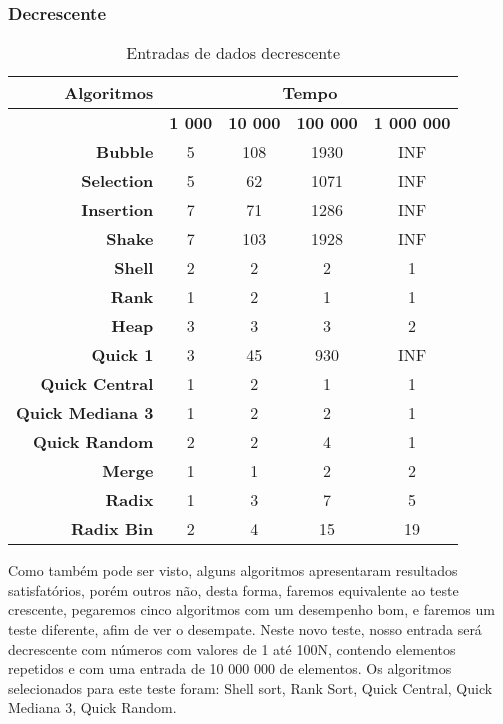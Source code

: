 \documentclass[
	12pt,				%
	oneside,			%
	a4paper,			%
	english,			%
	brazil,				%
	]{article}
\begin{document}
\subsubsection{Decrescente}
\begin{table}[H]
\centering
\begin{tabular}{|r|c|c|c|c|}
\cline{1-5} 
 \textbf{Algoritmos} & \multicolumn{4}{|c|}{\textbf{Tempo}}  \\
 \hline
 \textbf{} & \textbf{1 000} & \textbf{10 000} & \textbf{100 000} & \textbf{1 000 000}\\
 \hline
 \textbf{Bubble} & 5 & 108 & 1930 & INF \\
 \hline
 \textbf{Selection} & 5 & 62 & 1071 & INF \\
 \hline
 \textbf{Insertion} & 7 & 71 & 1286 & INF \\
 \hline
 \textbf{Shake} & 7 & 103 & 1928 & INF \\
 \hline
 \textbf{Shell} & 2 & 2 & 2 & 1 \\
 \hline
 \textbf{Rank} & 1 & 2 & 1 & 1 \\
 \hline
 \textbf{Heap} & 3 & 3 & 3 & 2 \\
 \hline
 \textbf{Quick 1} & 3 & 45 & 930 & INF \\
 \hline
 \textbf{Quick Central} & 1 & 2 & 1 & 1 \\
 \hline
 \textbf{Quick Mediana 3} & 1 & 2 & 2 & 1 \\
 \hline
 \textbf{Quick Random} & 2 & 2 & 4 & 1 \\
 \hline
 \textbf{Merge} & 1 & 1 & 2 & 2 \\
 \hline
 \textbf{Radix} & 1 & 3 & 7 & 5 \\
 \hline
 \textbf{Radix Bin} & 2 & 4 & 15 & 19 \\
 \hline
\end{tabular} 
\caption{Entradas de dados decrescente}
\end{table}
Como também pode ser visto, alguns algoritmos apresentaram resultados satisfatórios, porém outros não, desta forma, faremos equivalente ao teste crescente, pegaremos cinco algoritmos com 
um desempenho bom, e faremos um teste diferente, afim de ver o desempate. Neste novo teste, nosso entrada será decrescente com números com valores de 1 até 100N, contendo elementos repetidos 
e com uma entrada de 10 000 000 de elementos. Os algoritmos selecionados para este teste foram: Shell sort, Rank Sort, Quick Central, Quick Mediana 3, Quick Random.
\end{document}
